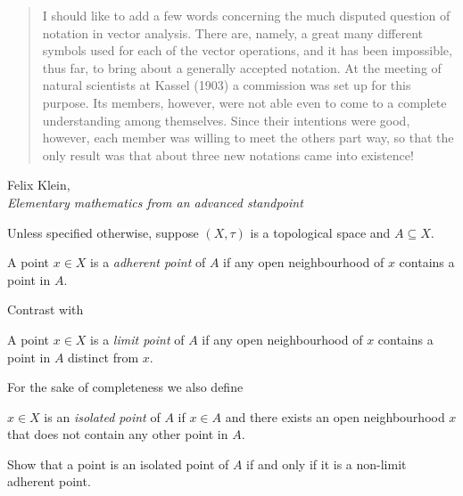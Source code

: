 \documentclass[a4paper]{article}
\begin{document}
\maketitle

\begin{quotation}
  I should like to add a few words concerning the much disputed question of notation in vector analysis. There are, namely, a great many different symbols used for each of the vector operations, and it has been impossible, thus far, to bring about a generally accepted notation. At the meeting of natural scientists at Kassel (1903) a commission was set up for this purpose. Its members, however, were not able even to come to a complete understanding among themselves. Since their intentions were good, however, each member was willing to meet the others part way, so that the only result was that about three new notations came into existence!
\end{quotation}

\begin{flushright}
  Felix Klein, \\
  \emph{Elementary mathematics from an advanced standpoint}
\end{flushright}

Unless specified otherwise, suppose \((X, \tau)\) is a topological space and \(A \subseteq X\).

\begin{definition}
  A point \(x \in X\) is a \emph{adherent point} of \(A\) if any open neighbourhood of \(x\) contains a point in \(A\).
\end{definition}

Contrast with

\begin{definition}
  A point \(x \in X\) is a \emph{limit point} of \(A\) if any open neighbourhood of \(x\) contains a point in \(A\) distinct from \(x\).
\end{definition}

For the sake of completeness we also define

\begin{definition}
  \(x \in X\) is an \emph{isolated point} of \(A\) if \(x \in A\) and there exists an open neighbourhood \(x\) that does not contain any other point in \(A\).
\end{definition}

\begin{ex}
  Show that a point is an isolated point of \(A\) if and only if it is a non-limit adherent point.
\end{ex}
\end{document}
